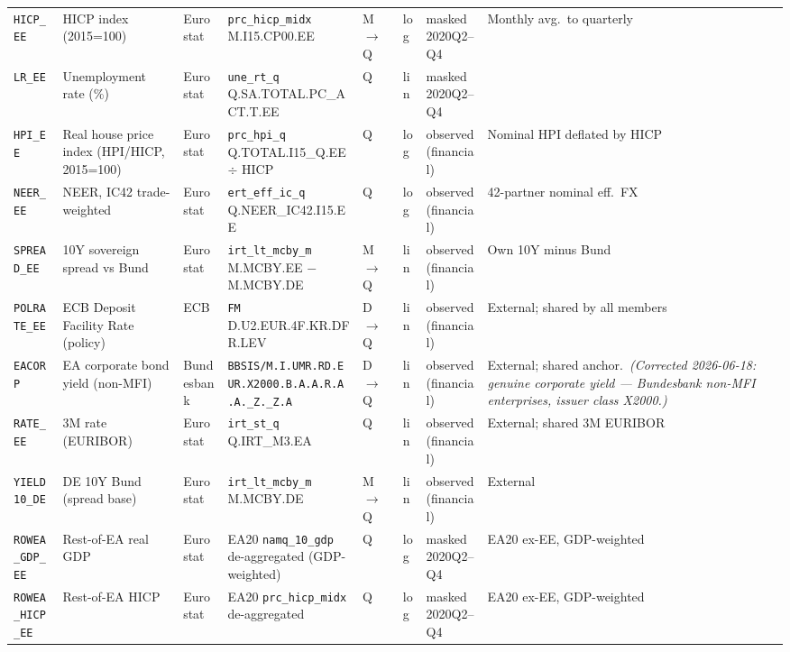 {\begin{longtable}{@{}p{1.9cm}p{2.9cm}p{1.5cm}p{2.7cm}p{0.7cm}p{1.0cm}p{1.6cm}p{2.4cm}@{}}
\texttt{HICP\_EE}     & HICP index (2015=100)             & Eurostat & \texttt{prc\_hicp\_midx} M.I15.CP00.EE                 & M$\to$Q & log & masked 2020Q2--Q4 & Monthly avg.\ to quarterly \\
\texttt{LR\_EE}       & Unemployment rate (\%)            & Eurostat & \texttt{une\_rt\_q} Q.SA.TOTAL.PC\_ACT.T.EE            & Q & lin & masked 2020Q2--Q4 & \\
\texttt{HPI\_EE}      & Real house price index (HPI/HICP, 2015=100) & Eurostat & \texttt{prc\_hpi\_q} Q.TOTAL.I15\_Q.EE $\div$ HICP & Q & log & observed (financial) & Nominal HPI deflated by HICP \\
\texttt{NEER\_EE}     & NEER, IC42 trade-weighted         & Eurostat & \texttt{ert\_eff\_ic\_q} Q.NEER\_IC42.I15.EE           & Q & log & observed (financial) & 42-partner nominal eff.\ FX \\
\texttt{SPREAD\_EE}   & 10Y sovereign spread vs Bund      & Eurostat & \texttt{irt\_lt\_mcby\_m} M.MCBY.EE $-$ M.MCBY.DE      & M$\to$Q & lin & observed (financial) & Own 10Y minus Bund \\
\texttt{POLRATE\_EE}  & ECB Deposit Facility Rate (policy) & ECB & \texttt{FM} D.\allowbreak U2.\allowbreak EUR.\allowbreak 4F.\allowbreak KR.\allowbreak DFR.\allowbreak LEV                     & D$\to$Q & lin & observed (financial) & External; shared by all members \\
\texttt{EACORP}       & EA corporate bond yield (non-MFI)  & Bundesbank & \texttt{BBSIS/\allowbreak M.\allowbreak I.\allowbreak UMR.\allowbreak RD.\allowbreak EUR.\allowbreak X2000.\allowbreak B.A.A.\allowbreak R.A.A.\allowbreak \_Z.\_Z.A}       & D$\to$Q & lin & observed (financial) & External; shared anchor.\ \textit{(Corrected 2026-06-18: genuine corporate yield --- Bundesbank non-MFI enterprises, issuer class X2000.)} \\
\texttt{RATE\_EE}     & 3M rate (EURIBOR)                 & Eurostat & \texttt{irt\_st\_q} Q.IRT\_M3.EA                       & Q & lin & observed (financial) & External; shared 3M EURIBOR \\
\texttt{YIELD10\_DE}  & DE 10Y Bund (spread base)         & Eurostat & \texttt{irt\_lt\_mcby\_m} M.MCBY.DE                    & M$\to$Q & lin & observed (financial) & External \\
\texttt{ROWEA\_GDP\_EE} & Rest-of-EA real GDP             & Eurostat & EA20 \texttt{namq\_10\_gdp} de-aggregated (GDP-weighted) & Q & log & masked 2020Q2--Q4 & EA20 ex-EE, GDP-weighted \\
\texttt{ROWEA\_HICP\_EE} & Rest-of-EA HICP               & Eurostat & EA20 \texttt{prc\_hicp\_midx} de-aggregated            & Q & log & masked 2020Q2--Q4 & EA20 ex-EE, GDP-weighted \\

\end{longtable}}
